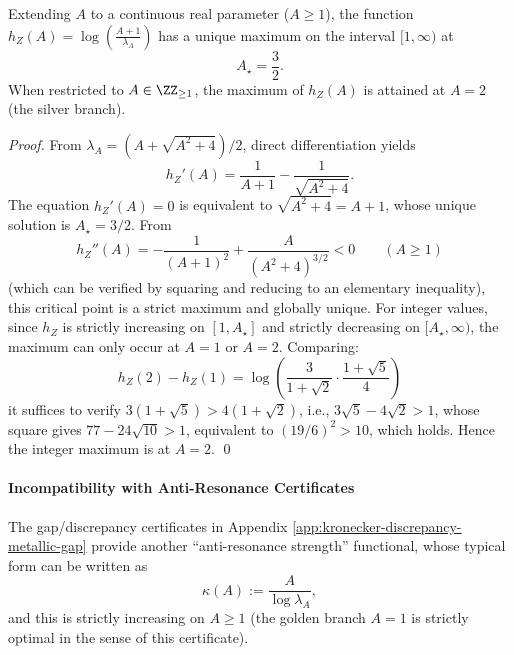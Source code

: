 \begin{proposition}[The Projection Compression Rate of the Metallic Mean Family Attains Its Maximum at \texorpdfstring{$A=\frac{3}{2}$}{A=3/2}]\label{prop:metallic-compression-extremum}
Extending $A$ to a continuous real parameter ($A\ge 1$), the function
\(
h_Z(A)=\log\!\left(\frac{A+1}{\lambda_A}\right)
\)
has a unique maximum on the interval $[1,\infty)$ at
\[
A_\star=\frac{3}{2}.
\]
When restricted to $A\in\ZZ_{\ge 1}$, the maximum of $h_Z(A)$ is attained at $A=2$ (the silver branch).
\end{proposition}
\begin{proof}
From $\lambda_A=(A+\sqrt{A^2+4})/2$, direct differentiation yields
\[
h_Z'(A)=\frac{1}{A+1}-\frac{1}{\sqrt{A^2+4}}.
\]
The equation $h_Z'(A)=0$ is equivalent to $\sqrt{A^2+4}=A+1$, whose unique solution is $A_\star=3/2$. From
\[
h_Z''(A)=-\frac{1}{(A+1)^2}+\frac{A}{(A^2+4)^{3/2}}<0\qquad(A\ge 1)
\]
(which can be verified by squaring and reducing to an elementary inequality), this critical point is a strict maximum and globally unique.
For integer values, since $h_Z$ is strictly increasing on $[1,A_\star]$ and strictly decreasing on $[A_\star,\infty)$, the maximum can only occur at $A=1$ or $A=2$. Comparing:
\[
h_Z(2)-h_Z(1)=\log\!\left(\frac{3}{1+\sqrt2}\cdot\frac{1+\sqrt5}{4}\right)
\]
it suffices to verify
\(
3(1+\sqrt5)>4(1+\sqrt2)
\), i.e.,
\(
3\sqrt5-4\sqrt2>1
\), whose square gives $77-24\sqrt{10}>1$, equivalent to $(19/6)^2>10$, which holds. Hence the integer maximum is at $A=2$. \qed
\end{proof}

\paragraph{Incompatibility with Anti-Resonance Certificates}
The gap/discrepancy certificates in Appendix \ref{app:kronecker-discrepancy-metallic-gap} provide another ``anti-resonance strength'' functional, whose typical form can be written as
\[
\kappa(A):=\frac{A}{\log\lambda_A},
\]
and this is strictly increasing on $A\ge 1$ (the golden branch $A=1$ is strictly optimal in the sense of this certificate).

